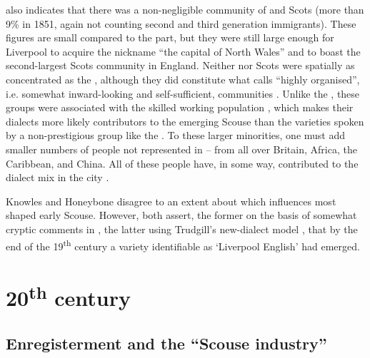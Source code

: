  also indicates that there was a non-negligible community of  and Scots (more than 9\% in 1851, again not counting second and third generation immigrants).
These figures are small compared to the  part, but they were still large enough for Liverpool to acquire the nickname ``the capital of North Wales'' and to boast the second-largest Scots community in England.
Neither  nor Scots were spatially as concentrated as the , although they did constitute what \citeauthor{honeybone2007} calls ``highly organised'', i.e. somewhat inward-look\-ing and self-sufficient, communities \citep[cf.][120--121]{honeybone2007}.
Unlike the , these groups were associated with the skilled working population \citep[cf.][202--203]{belchem2006b}, which makes their dialects more likely contributors to the emerging Scouse than the varieties spoken by a non-prestigious group like the .
To these larger minorities, one must add smaller numbers of people not represented in  -- from all over Britain, Africa, the Caribbean, and China.
All of these people have, in some way, contributed to the dialect mix in the city \citep[cf.][116]{honeybone2007}.

Knowles and Honeybone disagree to an extent about which influences most shaped early Scouse.
However, both assert, the former on the basis of somewhat cryptic comments in \citealt{ellis1889} \citep[cf.][18]{knowles1973}, the latter using Trudgill's new-dialect model \citep[cf.][118]{honeybone2007}, that by the end of the 19\textsuperscript{th} century a variety identifiable as `Liverpool English' had emerged.

	\section{20\textsuperscript{th} century}\label{sec.hist.20}

		\subsection{Enregisterment and the ``Scouse industry''}\label{sec.hist.20.industry}

